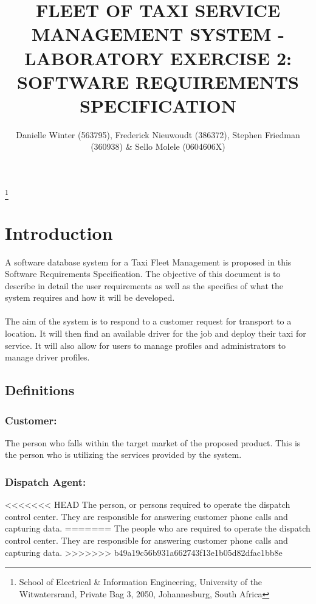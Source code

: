 \documentclass[10pt,twocolumn]{witseiepaper}
\begin{document}
\title{FLEET OF TAXI SERVICE MANAGEMENT SYSTEM - LABORATORY EXERCISE 2: SOFTWARE REQUIREMENTS SPECIFICATION}

\author{Danielle Winter (563795), Frederick Nieuwoudt (386372), Stephen Friedman (360938) \& Sello Molele (0604606X)}
\thanks{School of Electrical \& Information Engineering, University of the
Witwatersrand, Private Bag 3, 2050, Johannesburg, South Africa}


%

\maketitle
\thispagestyle{empty}\pagestyle{empty}


%
\section{Introduction}
A software database system for a Taxi Fleet Management is proposed in this Software Requirements Specification. The objective of this document is to describe in detail the user requirements as well as the specifics of what the system requires and how it will be developed.\\\\
The aim of the system is to respond to a customer request for transport to a location. It will then find an available driver for the job and deploy their taxi for service. It will also allow for users to manage profiles and administrators to manage driver profiles.

\subsection{Definitions}

\subsubsection{Customer:}
The person who falls within the target market of the proposed product. This is the person who is utilizing the services provided by the system.

\subsubsection{Dispatch Agent:}
<<<<<<< HEAD
The person, or persons required to operate the dispatch control center. They are responsible for answering customer phone calls and capturing data.
=======
The people who are required to operate the dispatch control center. They are responsible for answering customer phone calls and capturing data.
>>>>>>> b49a19c56b931a662743f13e1b05d82dfac1bb8e
\end{document}
